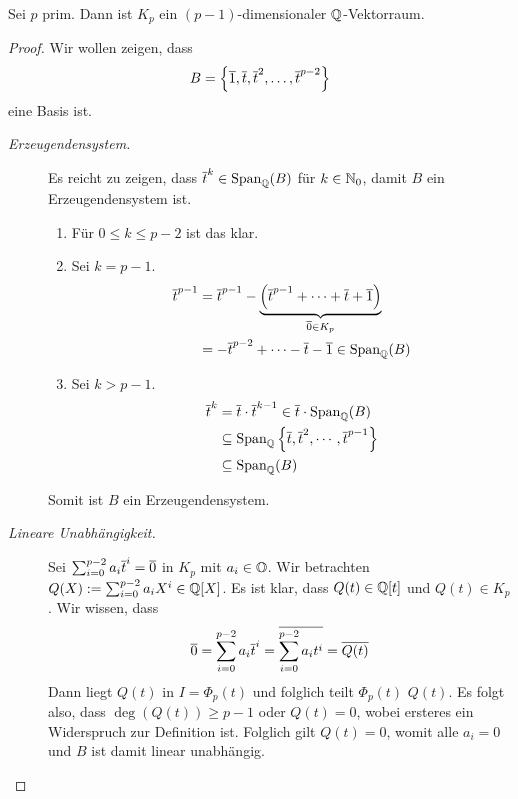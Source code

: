 \documentclass[12pt,a4paper]{scrartcl}
\begin{document}
\begin{lem} \label{lem:kreisteilkoerpervekraum}
	Sei $p$ prim. Dann ist $K_p$ ein $(p-1)$-dimensionaler $\mathbb Q$-Vektorraum.
\end{lem}

\begin{proof}
	Wir wollen zeigen, dass
	\begin{equation*}
		B = \left\lbrace \overline{1}, \overline{t}, \overline{t}^2, \dots, \overline{t}^{p-2} \right\rbrace 
	\end{equation*}
	eine Basis ist.
	
	\begin{description}
		\item[\emph{Erzeugendensystem.}] Es reicht zu zeigen, dass $\overline{t}^k \in \operatorname{Span}_{\mathbb Q}(B)$ für $k \in \mathbb N_0$, damit $B$ ein Erzeugendensystem ist.
		\begin{enumerate}
			\item Für $0 \leq k \leq p-2$ ist das klar.
			\item Sei $k = p-1$. 
			\begin{align*}
			\overline{t}^{p-1} &= \overline{t}^{p-1}- \underbrace{\left( \overline{t}^{p-1} + \dots + \overline{t} + \overline{1} \right)}_{\overline{0} \in K_p} \\
			&= - \overline{t}^{p-2} + \dots - \overline{t} - \overline{1} \in \operatorname{Span}_{\mathbb Q}(B)
			\end{align*}
			\item Sei $k > p-1$.
			\begin{align*}
			\overline{t}^k &= \overline{t} \cdot \overline{t}^{k-1} \in \overline{t} \cdot \operatorname{Span}_{\mathbb Q}(B) \\
			&\subseteq \operatorname{Span}_{\mathbb Q}\left\lbrace \overline{t}, \overline{t}^2, \cdots , \overline{t} ^ {p-1} \right\rbrace \\
			&\subseteq \operatorname{Span}_{\mathbb Q}(B)
			\end{align*}
		\end{enumerate}
		Somit ist $B$ ein Erzeugendensystem.
		\item[\emph{Lineare Unabhängigkeit.}] Sei $\sum_{i=0}^{p-2}a_i\overline{t}^i = \overline{0}$ in $K_p$ mit $a_i \in \mathbb O$. Wir betrachten $Q(X) := \sum_{i=0}^{p-2}a_iX^i \in \mathbb Q[X]$. Es ist klar, dass $Q(t) \in \mathbb Q[t]$ und $Q(t) \in K_p$. Wir wissen, dass
		\[
		\overline{0} = \sum_{i=0}^{p-2}a_i\overline{t}^i = \overline{\sum_{i=0}^{p-2}a_it^i} = \overline{Q(t)}
		\]
		Dann liegt $Q(t)$ in $I = \Phi_p(t)$ und folglich teilt $\Phi_p(t)$ $Q(t)$. Es folgt also, dass $\deg(Q(t)) \geq p-1$ oder $Q(t) = 0$, wobei ersteres ein Widerspruch zur Definition ist. Folglich gilt $Q(t) = 0$, womit alle $a_i = 0$ und $B$ ist damit linear unabhängig.
  \qedhere
	\end{description}
\end{proof}
\end{document}
